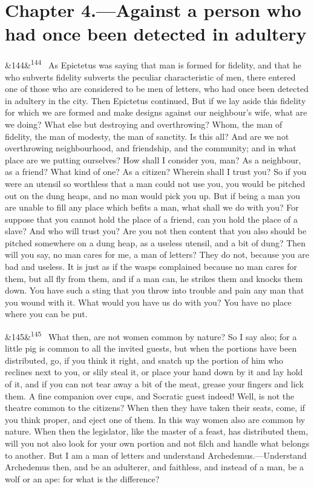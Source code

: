 \documentclass[12pt]{article}
\newcommand{\para}[1][]{\par\noindent\ifx&#1&\else\textsuperscript{\footnotesize #1}~\fi}
\begin{document}
\section*{Chapter 4.---Against a person who had once been detected in adultery}

\para[144] As Epictetus was saying that man is formed for fidelity, and that he who subverts fidelity subverts the peculiar characteristic of men, there entered one of those who are considered to be men of letters, who had once been detected in adultery in the city. Then Epictetus continued, But if we lay aside this fidelity for which we are formed and make designs against our neighbour's wife, what are we doing? What else but destroying and overthrowing? Whom, the man of fidelity, the man of modesty, the man of sanctity. Is this all? And are we not overthrowing neighbourhood, and friendship, and the community; and in what place are we putting ourselves? How shall I consider you, man? As a neighbour, as a friend? What kind of one? As a citizen? Wherein shall I trust you? So if you were an utensil so worthless that a man could not use you, you would be pitched out on the dung heaps, and no man would pick you up. But if being a man you are unable to fill any place which befits a man, what shall we do with you? For suppose that you cannot hold the place of a friend, can you hold the place of a slave? And who will trust you? Are you not then content that you also should be pitched somewhere on a dung heap, as a useless utensil, and a bit of dung? Then will you say, no man cares for me, a man of letters? They do not, because you are bad and useless. It is just as if the wasps complained because no man cares for them, but all fly from them, and if a man can, he strikes them and knocks them down. You have such a sting that you throw into trouble and pain any man that you wound with it. What would you have us do with you? You have no place where you can be put.

\para[145] What then, are not women common by nature? So I say also; for a little pig is common to all the invited guests, but when the portions have been distributed, go, if you think it right, and snatch up the portion of him who reclines next to you, or slily steal it, or place your hand down by it and lay hold of it, and if you can not tear away a bit of the meat, grease your fingers and lick them. A fine companion over cups, and Socratic guest indeed! Well, is not the theatre common to the citizens? When then they have taken their seats, come, if you think proper, and eject one of them. In this way women also are common by nature. When then the legislator, like the master of a feast, has distributed them, will you not also look for your own portion and not filch and handle what belongs to another. But I am a man of letters and understand Archedemus.—Understand Archedemus then, and be an adulterer, and faithless, and instead of a man, be a wolf or an ape: for what is the difference?
\end{document}
